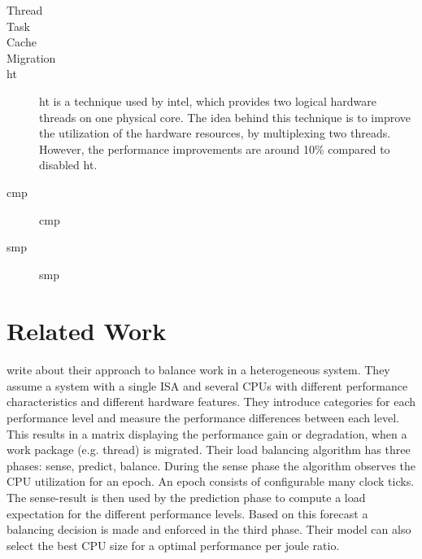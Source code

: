 \begin{description}
  \item[Thread]
  \item[Task]
  \item[Cache]
  \item[Migration]
  \item[\gls{ht}] \gls{ht} is a technique used by \gls{intel}, which provides
    two logical hardware threads on one physical core.
    The idea behind this technique is to improve the utilization of the
    hardware resources, by multiplexing two threads.
    However, the performance improvements are around 10\% compared to disabled
    \gls{ht}.
  \item[\gls{cmp}] \gls{cmp}
  \item[\gls{smp}] \gls{smp}
\end{description}



\section{Related Work}
\begin{comment}
  Structure for the description of related work:
    * Assumptions
    * Concept
    * Relevant contribution
    * Result
    * Deficits
\end{comment}

\paragraph{ \cite{sarma_smartbalance_2015} } \citeauthor{sarma_smartbalance_2015}
write about their approach to balance work in a heterogeneous system.
They assume a system with a single ISA and several CPUs with different performance
characteristics and different hardware features.
They introduce categories for each performance level and measure the
performance differences between each level.
This results in a matrix displaying the performance gain or degradation, when
a work package (e.g. thread) is migrated.
Their load balancing algorithm has three phases: sense, predict, balance.
During the sense phase the algorithm observes the CPU utilization for an epoch.
An epoch consists of configurable many clock ticks.
The sense-result is then used by the prediction phase to compute a load
expectation for the different performance levels.
Based on this forecast a balancing decision is made and enforced in the third
phase.
Their model can also select the best CPU size for a optimal performance per
joule ratio.


